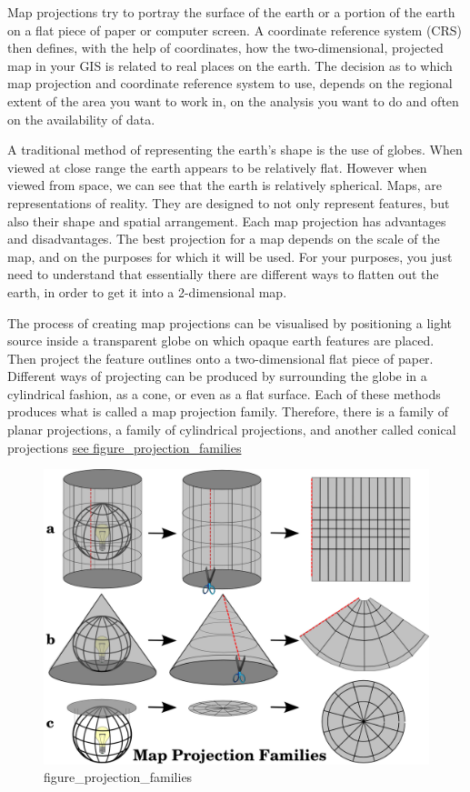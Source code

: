\documentclass[]{book}
\begin{document}
Map projections try to portray the surface of the earth or a portion of the earth on a flat piece of paper or computer screen. A coordinate reference system (CRS) then defines, with the help of coordinates, how the two-dimensional, projected map in your GIS is related to real places on the earth. The decision as to which map projection and coordinate reference system to use, depends on the regional extent of the area you want to work in, on the analysis you want to do and often on the availability of data.

A traditional method of representing the earth's shape is the use of globes. When viewed at close range the earth appears to be relatively flat. However when viewed from space, we can see that the earth is relatively spherical. Maps, are representations of reality. They are designed to not only represent features, but also their shape and spatial arrangement. Each map projection has advantages and disadvantages. The best projection for a map depends on the scale of the map, and on the purposes for which it will be used. For your purposes, you just need to understand that essentially there are different ways to flatten out the earth, in order to get it into a 2-dimensional map.

The process of creating map projections can be visualised by positioning a light source inside a transparent globe on which opaque earth features are placed. Then project the feature outlines onto a two-dimensional flat piece of paper. Different ways of projecting can be produced by surrounding the globe in a cylindrical fashion, as a cone, or even as a flat surface. Each of these methods produces what is called a map projection family. Therefore, there is a family of planar projections, a family of cylindrical projections, and another called conical projections \href{http://docs.qgis.org/2.8/en/_images/projection_families.png}{see figure\_projection\_families}

\begin{figure}
\centering
\includegraphics{img/projection_families.png}
\caption{figure\_projection\_families}
\end{figure}
\end{document}
